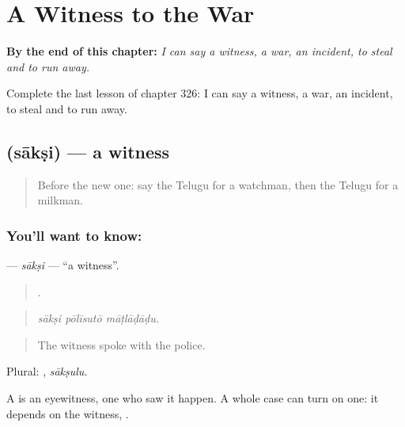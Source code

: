 
\chapter{A Witness to the War}
\label{ch:te-a-witness-to-the-war}

\begin{chapteropening}
\textbf{By the end of this chapter:} \emph{I can say a witness, a war, an incident, to steal and to run away.}

Complete the last lesson of chapter 326: I can say a witness, a war, an incident, to steal and to run away.
\end{chapteropening}

\section[\texorpdfstring{\te{సాక్షి} (sākṣi)}{సాక్షి (sākṣi)}]{ (sākṣi) — a witness}

\label{lesson:TE-C326-saksi}



\begin{quote}
Before the new one: say the Telugu for a watchman, then the Telugu for a milkman.
\end{quote}

\subsection*{You'll want to know: }
\textbf{} — \emph{sākṣi} — \textquotedblleft{}a witness\textquotedblright{}.

\begin{quote}
  .
\end{quote}

\begin{quote}
\emph{sākṣi pōlīsutō māṭlāḍāḍu.}
\end{quote}

\begin{quote}
The witness spoke with the police.
\end{quote}

Plural: , \emph{sākṣulu}.

A   is an eyewitness, one who saw it happen. A whole case can turn on one: it depends on the witness,    .

